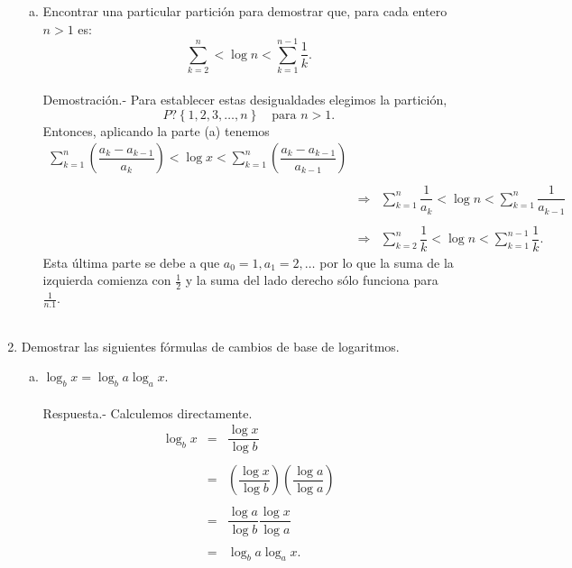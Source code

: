 \begin{enumerate}[\bfseries 1.]
\begin{enumerate}[a)]
	    \item Encontrar una particular partición para demostrar que, para cada entero $n>1$ es:
	    $$\sum_{k=2}^n<\log n<\sum_{k=1}^{n-1}\dfrac{1}{k}.$$\\
		Demostración.-\; Para establecer estas desigualdades elegimos la partición,
		$$P?\left\{1,2,3,\ldots,n\right\}\quad \mbox{para }n>1.$$
		Entonces, aplicando la parte (a) tenemos
		$$
		\begin{array}{rcl}
		    \displaystyle\sum_{k=1}^n \left(\dfrac{a_k-a_{k-1}}{a_k}\right) < \log x < \sum_{k=1}^n \left(\dfrac{a_k-a_{k-1}}{a_{k-1}}\right)\\\\
		    &\Rightarrow& \displaystyle\sum_{k=1}^n \dfrac{1}{a_k} < \log n < \sum_{k=1}^{n} \dfrac{1}{a_{k-1}}\\\\
		    &\Rightarrow& \displaystyle\sum_{k=2}^n \dfrac{1}{k} < \log n < \sum_{k=1}^{n-1} \dfrac{1}{k}.
		\end{array}
		$$
		Esta última parte se debe a que $a_0=1,a_1=2,\ldots$ por lo que la suma de la izquierda comienza con $\frac{1}{2}$ y la suma del lado derecho sólo funciona para $\frac{1}{n.1}$.\\\\

	\end{enumerate}

    \item Demostrar las siguientes fórmulas de cambios de base de logaritmos.

	\begin{enumerate}[(a)]

	    \item $\log_b x = \log_b a\log_a x$.\\\\
		Respuesta.-\; Calculemos directamente.
		$$
		\begin{array}{rcl}
		    \log_b x &=& \dfrac{\log x}{\log b}\\\\
			     &=& \left(\dfrac{\log x}{\log b}\right)\left(\dfrac{\log a}{\log a}\right)\\\\
			     &=& \dfrac{\log a}{\log b}\dfrac{\log x}{\log a}\\\\
			     &=& \log_b a\log_a x.
		\end{array}
		$$
		\vspace{.5cm}


\end{enumerate}
\end{enumerate}
